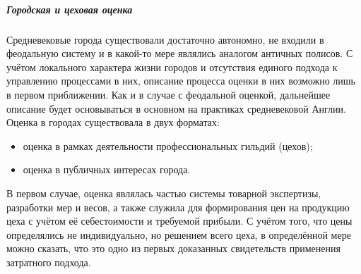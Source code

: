 \documentclass[12pt]{scrartcl}
\begin{document}
\subparagraph{Городская и цеховая оценка}
Средневековые города существовали достаточно автономно, не входили в феодальную систему и в какой-то мере являлись аналогом античных полисов. С учётом локального характера жизни городов и отсутствия единого подхода к управлению процессами в них, описание процесса оценки в них возможно лишь в первом приближении. Как и в случае с феодальной оценкой, дальнейшее описание будет основываться в основном на практиках средневековой Англии. Оценка в городах существовала в двух форматах:
\begin{itemize}
    \item оценка в рамках деятельности профессиональных гильдий (цехов);
    \item оценка в публичных интересах города.
\end{itemize}
В первом случае, оценка являлась частью системы товарной экспертизы, разработки мер и весов, а также служила для формирования цен на продукцию цеха с учётом её себестоимости и требуемой прибыли. С учётом того, что цены определялись не индивидуально, но решением всего цеха, в определённой мере можно сказать, что это одно из первых доказанных свидетельств применения затратного подхода.
\end{document}
